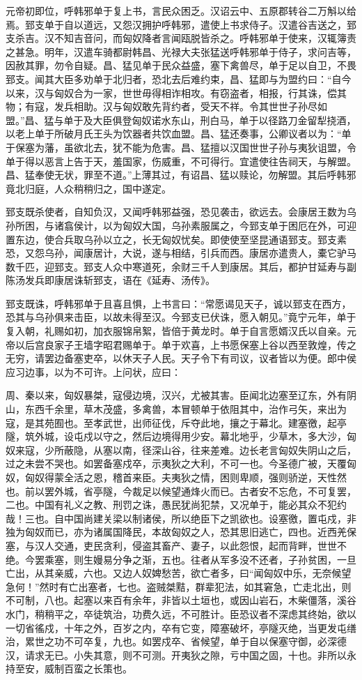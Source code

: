 \documentclass[]{article}
\begin{document}
元帝初即位，呼韩邪单于复上书，言民众困乏。汉诏云中、五原郡转谷二万斛以给焉。郅支单于自以道远，又怨汉拥护呼韩邪，遣使上书求侍子。汉遣谷吉送之，郅支杀吉。汉不知吉音问，而匈奴降者言闻瓯脱皆杀之。呼韩邪单于使来，汉辄簿责之甚急。明年，汉遣车骑都尉韩昌、光禄大夫张猛送呼韩邪单于侍子，求问吉等，因赦其罪，勿令自疑。昌、猛见单于民众益盛，塞下禽兽尽，单于足以自卫，不畏郅支。闻其大臣多劝单于北归者，恐北去后难约束，昌、猛即与为盟约曰：``自今以来，汉与匈奴合为一家，世世毋得相诈相攻。有窃盗者，相报，行其诛，偿其物；有寇，发兵相助。汉与匈奴敢先背约者，受天不祥。令其世世子孙尽如盟。''昌、猛与单于及大臣俱登匈奴诺水东山，刑白马，单于以径路刀金留犁挠酒，以老上单于所破月氏王头为饮器者共饮血盟。昌、猛还奏事，公卿议者以为：``单于保塞为藩，虽欲北去，犹不能为危害。昌、猛擅以汉国世世子孙与夷狄诅盟，令单于得以恶言上告于天，羞国家，伤威重，不可得行。宜遣使往告祠天，与解盟。昌、猛奉使无状，罪至不道。''上薄其过，有诏昌、猛以赎论，勿解盟。其后呼韩邪竟北归庭，人众稍稍归之，国中遂定。

郅支既杀使者，自知负汉，又闻呼韩邪益强，恐见袭击，欲远去。会康居王数为乌孙所困，与诸翕侯计，以为匈奴大国，乌孙素服属之，今郅支单于困厄在外，可迎置东边，使合兵取乌孙以立之，长无匈奴忧矣。即使使至坚昆通语郅支。郅支素恐，又怨乌孙，闻康居计，大说，遂与相结，引兵而西。康居亦遣贵人，橐它驴马数千匹，迎郅支。郅支人众中寒道死，余财三千人到康居。其后，都护甘延寿与副陈汤发兵即康居诛斩郅支，语在《延寿、汤传》。

郅支既诛，呼韩邪单于且喜且惧，上书言曰：``常愿谒见天子，诚以郅支在西方，恐其与乌孙俱来击臣，以故未得至汉。今郅支已伏诛，愿入朝见。''竟宁元年，单于复入朝，礼赐如初，加衣服锦帛絮，皆倍于黄龙时。单于自言愿婿汉氏以自亲。元帝以后宫良家子王墙字昭君赐单于。单于欢喜，上书愿保塞上谷以西至敦煌，传之无穷，请罢边备塞吏卒，以休天子人民。天子令下有司议，议者皆以为便。郎中侯应习边事，以为不可许。上问状，应曰：

周、秦以来，匈奴暴桀，寇侵边境，汉兴，尤被其害。臣闻北边塞至辽东，外有阴山，东西千余里，草木茂盛，多禽兽，本冒顿单于依阻其中，治作弓矢，来出为寇，是其苑囿也。至孝武世，出师征伐，斥夺此地，攘之于幕北。建塞徼，起亭隧，筑外城，设屯戍以守之，然后边境得用少安。幕北地乎，少草木，多大沙，匈奴来寇，少所蔽隐，从塞以南，径深山谷，往来差难。边长老言匈奴失阴山之后，过之未尝不哭也。如罢备塞戍卒，示夷狄之大利，不可一也。今圣德广被，天覆匈奴，匈奴得蒙全活之恩，稽首来臣。夫夷狄之情，困则卑顺，强则骄逆，天性然也。前以罢外城，省亭隧，今裁足以候望通烽火而已。古者安不忘危，不可复罢，二也。中国有礼义之教、刑罚之诛，愚民犹尚犯禁，又况单于，能必其众不犯约哉！三也。自中国尚建关梁以制诸侯，所以绝臣下之凯欲也。设塞徼，置屯戍，非独为匈奴而已，亦为诸属国降民，本故匈奴之人，恐其思旧逃亡，四也。近西羌保塞，与汉人交通，吏民贪利，侵盗其畜产、妻子，以此怨恨，起而背畔，世世不绝。今罢乘塞，则生嫚易分争之渐，五也。往者从军多没不还者，子孙贫困，一旦亡出，从其亲威，六也。又边人奴婢愁苦，欲亡者多，曰``闻匈奴中乐，无奈候望急何！''然时有亡出塞者，七也。盗贼桀黠，群辈犯法，如其窘急，亡走北出，则不可制，八也。起塞以来百有余年，非皆以土垣也，或因山岩石，木柴僵落，溪谷水门，稍稍平之，卒徒筑治，功费久远，不可胜计。臣恐议者不深虑其终始，欲以一切省徭戍，十年之外，百岁之内，卒有它变，障塞破坏，亭隧灭绝，当更发屯缮治，累世之功不可卒复，九也。如罢戍卒、省候望，单于自以保塞守御，必深德汉，请求无已。小失其意，则不可测。开夷狄之隙，亏中国之固，十也。非所以永持至安，威制百蛮之长策也。
\end{document}
